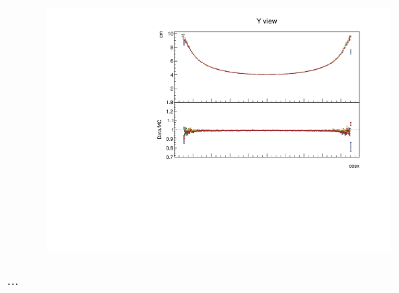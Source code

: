 \documentclass[12pt,a4paper]{article}
\begin{document}
\begin{figure}[h!]
\begin{subfigure}{0.5\textwidth}
  \end{subfigure}
  \begin{subfigure}{0.5\textwidth}
    \includegraphics[width=\linewidth]{PlotsAngularDistribution/cm_cosx_y.pdf}
  \end{subfigure}
  \caption{...}
  \label{figAbsCalibCosX2}
\end{figure}
\end{document}
